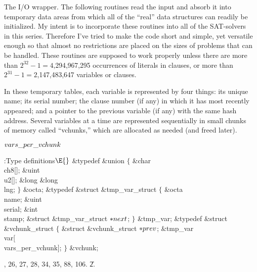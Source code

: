 The I/O wrapper. The following routines read the input and
absorb it into
temporary data areas from which all of the ``real'' data structures
can readily be initialized. My intent is to incorporate these routines into all
of the SAT-solvers in this series. Therefore I've tried to make the code
short and simple, yet versatile enough so that almost no restrictions are
placed on the sizes of problems that can be handled. These routines are
supposed to work properly unless there are more than
$2^{32}-1=4$,294,967,295 occurrences of literals in clauses,
or more than $2^{31}-1=2$,147,483,647 variables or clauses.

In these temporary tables, each variable is represented by four things:
its unique name; its serial number; the clause number (if any) in which it has
most recently appeared; and a pointer to the previous variable (if any)
with the same hash address. Several variables at a time
are represented sequentially in small chunks of memory called ``vchunks,''
which are allocated as needed (and freed later).

\Y\B\4\D$\\{vars\_per\_vchunk}$ \5
\par
\Y\B\4:Type definitions\X${}\E{}$\6
\&{typedef} \&{union} ${}\{{}$\1\6
\&{char} \\{ch8}[];\6
\&{uint} \\{u2}[];\6
\&{long} \&{long} \\{lng};\2\6
${}\}{}$ \&{octa};\6
\&{typedef} \&{struct} \&{tmp\_var\_struct} ${}\{{}$\1\6
\&{octa} \\{name};\6
\&{uint} \\{serial};\6
\&{int} \\{stamp};\6
\&{struct} \&{tmp\_var\_struct} ${}{*}\\{next}{}$;\2%
\6
${}\}{}$ \&{tmp\_var};\7
\&{typedef} \&{struct} \&{vchunk\_struct} ${}\{{}$\1\6
\&{struct} \&{vchunk\_struct} ${}{*}\\{prev}{}$;\6
\&{tmp\_var} \\{var}[\\{vars\_per\_vchunk}];\2\6
${}\}{}$ \&{vchunk};\par
{}, 26, 27, 28, 34, 35, 88, 106.
\U2.\fi

